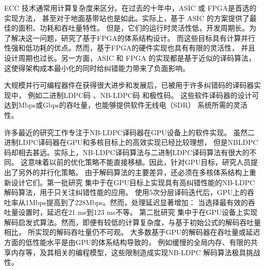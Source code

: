 \documentclass{cjc}
\begin{document}
  ECC 技术通常用计算复杂度来区分。在过去的十年中，ASIC 或 FPGA是首选的实现方法，
  甚至对于地面基带站也是如此。实际上，基于 ASIC 的方案提供了最佳的面积、功耗和吞吐量特性。
  但是，它们的运行时灵活性低，开发周期长。为了解决这一问题，研究了基于FPGA的体系结构设计。
  而这些目标具有计算并行性强和低功耗的优点。然而，基于FPGA的硬件实现也具有有限的灵活性，
  并且设计周期也过长。另一方面，ASIC 和 FPGA 的实现都是基于近似的译码算法，
  这使得架构成本最小化的同时给纠错能力带来了负面影响。

  大规模并行可编程器件在获得很大进步和发展后，已被用于许多纠错码的译码器实现中，
  例如二进制LDPC码\cite{chang_accelerating_2011,falcao_portable_2012,noauthor_wang_nodate-1,li_efficient_2013,lin_high_2014,gal_high-throughput_2016,andrade_survey_2016}
  、NB-LDPC码\cite{noauthor_wang_nodate,noauthor_andrade_nodate,noauthor_beermann_nodate,andrade_optimized_2014,noauthor_thi_nodate,beermann_gpu_2015,noauthor_pham_nodate,liu_high-throughput_2018}
  和极性码\cite{noauthor_gal_nodate,gal_multi-gbs_2015,giard_low-latency_2018}。
  这些软件译码器的设计可达到Mbps或Gbps的吞吐量，也能够提供软件无线电（SDR）\cite{grayver_implementing_2013}
  系统所需的灵活性。

  许多最近的研究工作专注于NB-LDPC译码器在GPU设备上的软件实现\cite{noauthor_wang_nodate,noauthor_andrade_nodate,noauthor_beermann_nodate,andrade_optimized_2014,noauthor_thi_nodate,beermann_gpu_2015,noauthor_pham_nodate,liu_high-throughput_2018}。
  虽然二进制LDPC译码器在GPU和多核目标上的高效实现已经比较理想\cite{chang_accelerating_2011,falcao_portable_2012,noauthor_wang_nodate-1,li_efficient_2013,lin_high_2014,gal_high-throughput_2016,andrade_survey_2016}，
  但是NBLDPC码却相去甚远。实际上，NB-LDPC译码算法与二进制LDPC译码算法有很大的不同。
  这意味着以前的优化策略不能直接移植。因此，针对GPU目标，研究人员提出了另外的并行化策略。
  由于解码算法的主要差异，还必须在多核体系结构上重新设计它们。第一批研究\cite{noauthor_andrade_nodate,noauthor_beermann_nodate,andrade_optimized_2014,beermann_gpu_2015,liu_high-throughput_2018}
  集中于在GPU目标上实现具有高纠错性能的NB-LDPC解码算法，用于只关注纠错性能的应用。
  使用5次分层译码迭代后，GPU上的吞吐率从1Mbps提高到了228Mbps。然而，处理延迟显著增加：
  当选择最有效的吞吐量设置时，延迟在21 ms到123 ms不等\cite{liu_high-throughput_2018}。
  第二批研究\cite{noauthor_wang_nodate,noauthor_thi_nodate,noauthor_pham_nodate}
  集中于在GPU设备上实现解码启发式算法。然而，即便有较低的计算复杂度，与基于初始公式的解码吞吐量相比，
  所实现的解码吞吐量仍不可观\cite{noauthor_andrade_nodate,liu_high-throughput_2018}。
  大多数基于GPU的解码器在吞吐量或延迟方面的低性能水平是由GPU的体系结构导致的，
  例如缓慢的全局内存、有限的共享内存等，及其相关的编程模型，这些限制造成实现NB-LDPC
  解码算法极具挑战性。
\end{document}
